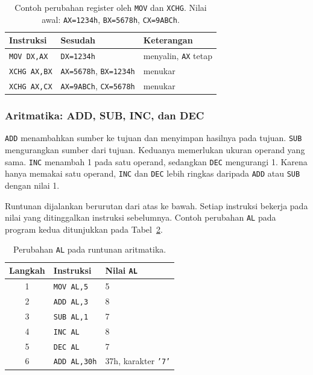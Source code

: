 \begin{table}[H]
    \centering
    \caption{Contoh perubahan register oleh \texttt{MOV} dan
    \texttt{XCHG}. Nilai awal: \texttt{AX=1234h}, \texttt{BX=5678h},
    \texttt{CX=9ABCh}.}
    \label{tab:m03-pindah}
    \small
    \begin{tabular}{@{}lll@{}}
        \toprule
        \textbf{Instruksi} & \textbf{Sesudah} & \textbf{Keterangan} \\
        \midrule
        \texttt{MOV DX,AX} & \texttt{DX=1234h} & menyalin, \texttt{AX}
        tetap \\
        \texttt{XCHG AX,BX} & \texttt{AX=5678h}, \texttt{BX=1234h}
        & menukar \\
        \texttt{XCHG AX,CX} & \texttt{AX=9ABCh}, \texttt{CX=5678h}
        & menukar \\
        \bottomrule
    \end{tabular}
\end{table}

\subsubsection*{Aritmatika: ADD, SUB, INC, dan DEC}

\texttt{ADD} menambahkan sumber ke tujuan dan menyimpan hasilnya pada
tujuan. \texttt{SUB} mengurangkan sumber dari tujuan. Keduanya
memerlukan ukuran operand yang sama. \texttt{INC} menambah 1 pada
satu operand, sedangkan \texttt{DEC} mengurangi 1. Karena hanya
memakai satu operand, \texttt{INC} dan \texttt{DEC} lebih ringkas
daripada \texttt{ADD} atau \texttt{SUB} dengan nilai 1.

Runtunan dijalankan berurutan dari atas ke bawah. Setiap instruksi
bekerja pada nilai yang ditinggalkan instruksi sebelumnya. Contoh
perubahan \texttt{AL} pada program kedua ditunjukkan pada
Tabel~\ref{tab:m03-hitung}.

\begin{table}[H]
    \centering
    \caption{Perubahan \texttt{AL} pada runtunan aritmatika.}
    \label{tab:m03-hitung}
    \small
    \begin{tabular}{@{}cll@{}}
        \toprule
        \textbf{Langkah} & \textbf{Instruksi} & \textbf{Nilai \texttt{AL}} \\
        \midrule
        1 & \texttt{MOV AL,5} & 5 \\
        2 & \texttt{ADD AL,3} & 8 \\
        3 & \texttt{SUB AL,1} & 7 \\
        4 & \texttt{INC AL} & 8 \\
        5 & \texttt{DEC AL} & 7 \\
        6 & \texttt{ADD AL,30h} & 37h, karakter \texttt{'7'} \\
        \bottomrule
    \end{tabular}
\end{table}

